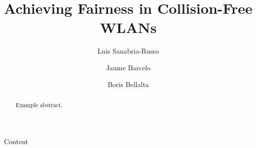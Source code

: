 \documentclass[]{llncs}
\begin{document}
\title{Achieving Fairness in Collision-Free WLANs}
\author{Luis Sanabria-Russo \and Jaume Barcelo \and Boris Bellalta}
\maketitle

\begin{abstract}
Example abstract.
\end{abstract}

Content
\end{document}
